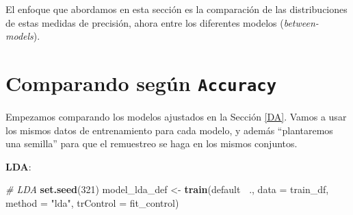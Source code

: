 \documentclass[]{book}
\newenvironment{Shaded}{\begin{snugshade}}{\end{snugshade}}
\newcommand{\CommentTok}[1]{\textcolor[rgb]{0.56,0.35,0.01}{\textit{#1}}}
\newcommand{\DataTypeTok}[1]{\textcolor[rgb]{0.13,0.29,0.53}{#1}}
\newcommand{\DecValTok}[1]{\textcolor[rgb]{0.00,0.00,0.81}{#1}}
\newcommand{\FloatTok}[1]{\textcolor[rgb]{0.00,0.00,0.81}{#1}}
\newcommand{\KeywordTok}[1]{\textcolor[rgb]{0.13,0.29,0.53}{\textbf{#1}}}
\newcommand{\NormalTok}[1]{#1}
\newcommand{\OperatorTok}[1]{\textcolor[rgb]{0.81,0.36,0.00}{\textbf{#1}}}
\newcommand{\OtherTok}[1]{\textcolor[rgb]{0.56,0.35,0.01}{#1}}
\newcommand{\StringTok}[1]{\textcolor[rgb]{0.31,0.60,0.02}{#1}}
\begin{document}
El enfoque que abordamos en esta sección es la comparación de las distribuciones de estas medidas de precisión, ahora entre los diferentes modelos (\emph{between-models}).

\hypertarget{comparando-seguxfan-accuracy}{%
\section{\texorpdfstring{Comparando según \texttt{Accuracy}}{Comparando según Accuracy}}\label{comparando-seguxfan-accuracy}}

Empezamos comparando los modelos ajustados en la Sección \ref{DA}. Vamos a usar los mismos datos de entrenamiento para cada modelo, y además ``plantaremos una semilla'' para que el remuestreo se haga en los mismos conjuntos.

\begin{Shaded}
\end{Shaded}

\textbf{LDA}:

\begin{Shaded}
\begin{Highlighting}[]
\CommentTok{# LDA}
\KeywordTok{set.seed}\NormalTok{(}\DecValTok{321}\NormalTok{)}
\NormalTok{model_lda_def <-}\StringTok{ }\KeywordTok{train}\NormalTok{(default }\OperatorTok{~}\NormalTok{.,}
                       \DataTypeTok{data =}\NormalTok{ train_df,}
                       \DataTypeTok{method =} \StringTok{"lda"}\NormalTok{,}
                       \DataTypeTok{trControl =}\NormalTok{ fit_control)}
\end{Highlighting}
\end{Shaded}
\end{document}
